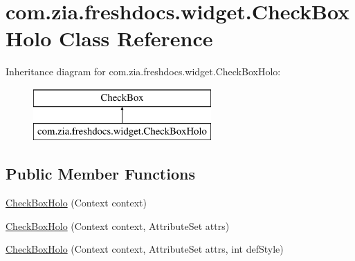 \hypertarget{classcom_1_1zia_1_1freshdocs_1_1widget_1_1_check_box_holo}{\section{com.\-zia.\-freshdocs.\-widget.\-Check\-Box\-Holo Class Reference}
\label{classcom_1_1zia_1_1freshdocs_1_1widget_1_1_check_box_holo}
}
Inheritance diagram for com.\-zia.\-freshdocs.\-widget.\-Check\-Box\-Holo\-:\begin{figure}[H]
\begin{center}
\leavevmode
\includegraphics[height=2.000000cm]{classcom_1_1zia_1_1freshdocs_1_1widget_1_1_check_box_holo}
\end{center}
\end{figure}
\subsection*{Public Member Functions}
\begin{DoxyCompactItemize}
\item 
\hyperlink{classcom_1_1zia_1_1freshdocs_1_1widget_1_1_check_box_holo_af4a0fd31164df3ce3144456fc3822242}{Check\-Box\-Holo} (Context context)
\item 
\hyperlink{classcom_1_1zia_1_1freshdocs_1_1widget_1_1_check_box_holo_a9dc7d2874bc5134dcd352a65d8b03d57}{Check\-Box\-Holo} (Context context, Attribute\-Set attrs)
\item 
\hyperlink{classcom_1_1zia_1_1freshdocs_1_1widget_1_1_check_box_holo_afb5b163dc68b8d406ef237c66153b81c}{Check\-Box\-Holo} (Context context, Attribute\-Set attrs, int def\-Style)
\end{DoxyCompactItemize}


